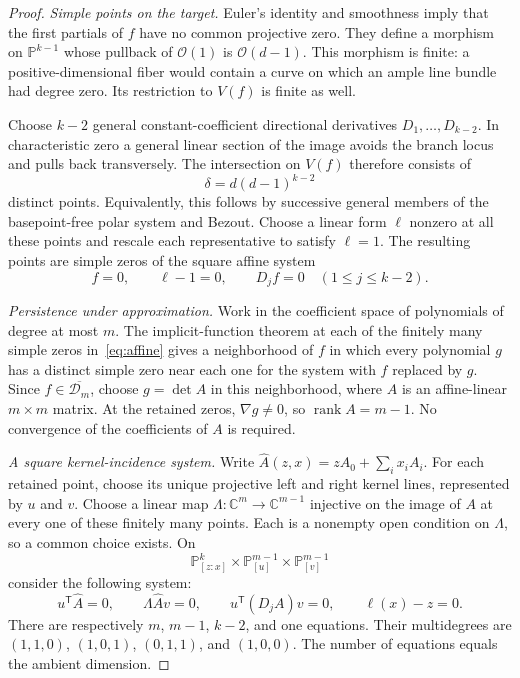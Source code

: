 \documentclass[11pt]{article}
\theoremstyle{remark}\newtheorem{remark}[theorem]{Remark}
\DeclareMathOperator{\rank}{rank}
\newcommand{\C}{\mathbb C}
\newcommand{\PP}{\mathbb P}
\begin{document}
\begin{proof}
\emph{Simple points on the target.}
Euler's identity and smoothness imply that the first partials of $f$
have no common projective zero. They define a morphism on
$\PP^{k-1}$ whose pullback of $\mathcal O(1)$ is
$\mathcal O(d-1)$. This morphism is finite: a positive-dimensional
fiber would contain a curve on which an ample line bundle had degree
zero. Its restriction to $V(f)$ is finite as well.

Choose $k-2$ general constant-coefficient directional derivatives
$D_1,\ldots,D_{k-2}$. In characteristic zero a general linear section
of the image avoids the branch locus and pulls back transversely.
The intersection on $V(f)$ therefore consists of
\[
 \delta=d(d-1)^{k-2}
\]
distinct points. Equivalently, this follows by successive general
members of the basepoint-free polar system and Bezout. Choose a linear
form $\ell$ nonzero at all these points and rescale each representative
to satisfy $\ell=1$. The resulting points are simple zeros of the
square affine system
\begin{equation}\label{eq:affine}
 f=0,\qquad \ell-1=0,\qquad D_jf=0\quad(1\le j\le k-2).
\end{equation}

\emph{Persistence under approximation.}
Work in the coefficient space of polynomials of degree at most $m$.
The implicit-function theorem at each of the finitely many simple
zeros in~\eqref{eq:affine} gives a neighborhood of $f$ in which every
polynomial $g$ has a distinct simple zero near each one for the system
with $f$ replaced by $g$. Since $f\in\overline{\mathcal D_m}$, choose
$g=\det A$ in this neighborhood, where $A$ is an affine-linear
$m\times m$ matrix. At the retained zeros, $\nabla g\ne0$, so
$\rank A=m-1$. No convergence of the coefficients of $A$ is required.

\emph{A square kernel-incidence system.}
Write $\widehat A(z,x)=zA_0+\sum_i x_iA_i$. For each retained point,
choose its unique projective left and right kernel lines, represented
by $u$ and $v$. Choose a linear map
$\Lambda:\C^m\to\C^{m-1}$ injective on the image of $A$ at every
one of these finitely many points. Each is a nonempty open condition
on $\Lambda$, so a common choice exists. On
\[
 \PP^k_{[z:x]}\times\PP^{m-1}_{[u]}\times\PP^{m-1}_{[v]}
\]
consider the following system:
\begin{equation}\label{eq:incidence}
 u^{\mathsf T}\widehat A=0,\qquad
 \Lambda\widehat A v=0,\qquad
 u^{\mathsf T}(D_jA)v=0,\qquad
 \ell(x)-z=0.
\end{equation}
There are respectively $m$, $m-1$, $k-2$, and one equations. Their
multidegrees are $(1,1,0)$, $(1,0,1)$, $(0,1,1)$, and $(1,0,0)$.
The number of equations equals the ambient dimension.


\end{proof}
\end{document}
